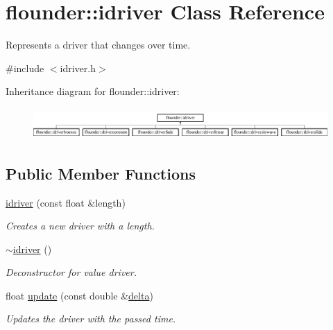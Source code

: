 \hypertarget{classflounder_1_1idriver}{}\section{flounder\+:\+:idriver Class Reference}
\label{classflounder_1_1idriver}


Represents a driver that changes over time.  




{\ttfamily \#include $<$idriver.\+h$>$}

Inheritance diagram for flounder\+:\+:idriver\+:\begin{figure}[H]
\begin{center}
\leavevmode
\includegraphics[height=1.212121cm]{classflounder_1_1idriver}
\end{center}
\end{figure}
\subsection*{Public Member Functions}
\begin{DoxyCompactItemize}
\item 
\hyperlink{classflounder_1_1idriver_a84bafd01e3984ededbb170a5efbad0f0}{idriver} (const float \&length)
\begin{DoxyCompactList}\small\item\em Creates a new driver with a length. \end{DoxyCompactList}\item 
\hyperlink{classflounder_1_1idriver_a873c8a53f058e3df6467bfec55dc3ae2}{$\sim$idriver} ()
\begin{DoxyCompactList}\small\item\em Deconstructor for value driver. \end{DoxyCompactList}\item 
float \hyperlink{classflounder_1_1idriver_a1131c4e506fa5bfe3fae51b6636a09a9}{update} (const double \&\hyperlink{classflounder_1_1delta}{delta})
\begin{DoxyCompactList}\small\item\em Updates the driver with the passed time. \end{DoxyCompactList}\end{DoxyCompactItemize}
